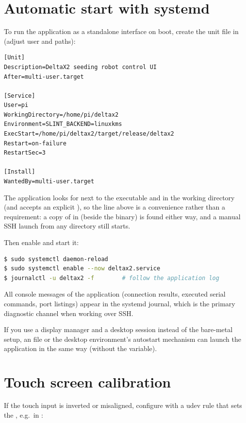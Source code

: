 \section{Automatic start with systemd}
\label{sec:systemd}

To run the application as a standalone interface on boot, create the unit file
 in  (adjust user and paths):

\begin{lstlisting}
[Unit]
Description=DeltaX2 seeding robot control UI
After=multi-user.target

[Service]
User=pi
WorkingDirectory=/home/pi/deltax2
Environment=SLINT_BACKEND=linuxkms
ExecStart=/home/pi/deltax2/target/release/deltax2
Restart=on-failure
RestartSec=3

[Install]
WantedBy=multi-user.target
\end{lstlisting}

The application looks for  next to the executable and in the
working directory (and accepts an explicit ), so the
 line above is a convenience rather than a requirement:
a copy of  in  (beside the binary) is
found either way, and a manual SSH launch from any directory still starts.

Then enable and start it:

\begin{lstlisting}[language=bash]
$ sudo systemctl daemon-reload
$ sudo systemctl enable --now deltax2.service
$ journalctl -u deltax2 -f        # follow the application log
\end{lstlisting}

All console messages of the application (connection results, executed serial
commands, port listings) appear in the systemd journal, which is the primary
diagnostic channel when working over SSH.

If you use a display manager and a desktop session instead of the bare-metal
 setup, an  file or the desktop environment's
autostart mechanism can launch the application in the same way (without the
 variable).

\section{Touch screen calibration}
\label{sec:touchcal}

If the touch input is inverted or misaligned, configure  with a udev
rule that sets the , e.g.\ in
:

